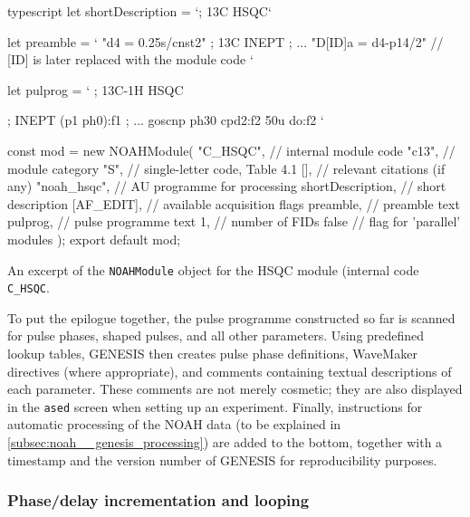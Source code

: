 \begin{mylisting}[!ht] %
\begin{tcbminted}{typescript}
let shortDescription = `; 13C HSQC`

let preamble = `
"d4      = 0.25s/cnst2"                ; 13C INEPT
; ...
"D[ID]a  = d4-p14/2"    // [ID] is later replaced with the module code
`

let pulprog = `
  ; 13C-1H HSQC

  ; INEPT
  (p1 ph0):f1
  ; ...
  goscnp ph30 cpd2:f2
  50u do:f2
`

const mod = new NOAHModule(
    "C_HSQC",           // internal module code
    "c13",              // module category
    "S",                // single-letter code, Table 4.1
    [],                 // relevant citations (if any)
    "noah_hsqc",        // AU programme for processing
    shortDescription,   // short description
    [AF_EDIT],          // available acquisition flags
    preamble,           // preamble text
    pulprog,            // pulse programme text
    1,                  // number of FIDs
    false               // flag for 'parallel' modules
);
export default mod;
\end{tcbminted}
\caption[HSQC \texttt{NOAHModule} object]{An excerpt of the \texttt{NOAHModule} object for the HSQC module (internal code \texttt{C\_HSQC}.}
    \label{lst:module_c_hsqc}
\end{mylisting} %

To put the epilogue together, the pulse programme constructed so far is scanned for pulse phases, shaped pulses, and all other parameters.
Using predefined lookup tables, GENESIS then creates pulse phase definitions, WaveMaker directives (where appropriate), and comments containing textual descriptions of each parameter.
These comments are not merely cosmetic; they are also displayed in the \texttt{ased} screen when setting up an experiment.
Finally, instructions for automatic processing of the NOAH data (to be explained in \cref{subsec:noah__genesis_processing}) are added to the bottom, together with a timestamp and the version number of GENESIS for reproducibility purposes.

\subsubsection{Phase/delay incrementation and looping}

